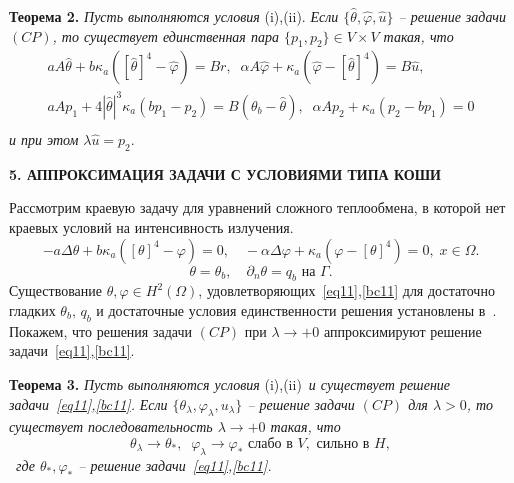 \documentclass[12pt]{article}
\begin{document}
    \textbf{Теорема 2.}
    \textit{Пусть выполняются условия} (i),(ii).
    \textit{
        Если $\{\hat{\theta}, \hat{\varphi}, \hat{u}\}$ -- решение
        задачи $(CP)$, то существует единственная пара $\{p_1, p_2 \} \in V\times V$ такая, что
    }
    \begin{gather}
        \label{eq:as}
        aA\hat{\theta} + b \kappa_a([\hat{\theta}]^4 -\hat{\varphi}) = Br, \;\;
        \alpha A \hat{\varphi} + \kappa_a(\hat{\varphi} - [\hat{\theta}]^4) = B\hat{u},\\
        aAp_1 +4|\hat{\theta}|^3 \kappa_a(bp_1 - p_2) = B(\theta_b - \hat{\theta}), \;\;
        \alpha A p_2 + \kappa_a (p_2 - b p_1) = 0\\
    \end{gather}
    \textit{и при этом} $\lambda\hat{u} = p_2.$




    \begin{center}
        \textbf{5. АППРОКСИМАЦИЯ ЗАДАЧИ С УСЛОВИЯМИ ТИПА КОШИ}
    \end{center}


    Рассмотрим краевую задачу для уравнений сложного теплообмена, в которой нет краевых условий на
    интенсивность излучения.
    \begin{equation}
        \label{eq11}
        - a\Delta\theta + b\kappa_a([\theta]^4- \varphi)=0,\quad
        -\alpha \Delta \varphi +
        \kappa_a(\varphi-[\theta]^4)=0,\; x\in\Omega.
    \end{equation}
    \begin{equation}
        \label{bc11}
        \theta=\theta_b,\quad \partial_n\theta = q_b \text{  на  }\Gamma.
    \end{equation}
    Существование $\theta,\varphi\in H^2(\Omega)$, удовлетворяющих~\eqref{eq11},\eqref{bc11}
    для достаточно гладких
    $\theta_b,\, q_b$ и достаточные условия единственности решения установлены в~\cite{CMMP20}.
    Покажем, что решения задачи $(CP)$ при $\lambda\to+0$
    аппроксимируют решение задачи~\eqref{eq11},\eqref{bc11}.


    \textbf{Теорема 3.}
    \textit{Пусть выполняются условия} (i),(ii)~\textit{и существует решение задачи~\eqref{eq11},\eqref{bc11}.}
    \textit{
        Если $\{\theta_\lambda,\varphi_\lambda,u_\lambda\}$ -- решение
        задачи $(CP)$ для $\lambda>0$, то существует последовательность $\lambda\to +0$ такая, что
    }
    \[
        \theta_\lambda\rightarrow\theta_*, \;\; \varphi_\lambda\rightarrow\varphi_*
        \text{ слабо в }V,\text{ сильно в }H,
    \]~\textit{где $\theta_*,\varphi_*$ -- решение задачи~\eqref{eq11},\eqref{bc11}.}
\end{document}
